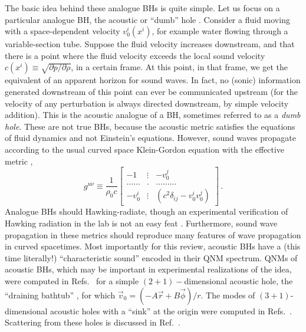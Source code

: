 \documentclass[]{iopart}
\def\be{\begin{equation}}
\def\ee{\end{equation}}
\begin{document}
The basic idea behind these analogue BHs is quite simple. Let us focus on a
particular analogue BH, the acoustic or ``dumb'' hole
\cite{Unruh:1980cg,Visser:1997ux}.  Consider a fluid moving with a
space-dependent velocity $v_0^i(x^i)$, for example water flowing through a
variable-section tube. Suppose the fluid velocity increases downstream, and
that there is a point where the fluid velocity exceeds the local sound
velocity $c(x^i)\equiv \sqrt{\partial p/\partial \rho}$, in a certain
frame. At this point, in that frame, we get the equivalent of an apparent
horizon for sound waves. In fact, no (sonic) information generated downstream
of this point can ever be communicated upstream (for the velocity of any
perturbation is always directed downstream, by simple velocity addition). This
is the acoustic analogue of a BH, sometimes referred to as a {\it dumb
  hole}. These are not true BHs, because the acoustic metric satisfies the
equations of fluid dynamics and not Einstein's equations.  However, sound
waves propagate according to the usual curved space Klein-Gordon equation with
the effective metric \cite{Unruh:1980cg,Visser:1997ux,Barcelo:2005fc},
%
\be
g^{u \nu}\equiv \frac{1}{\rho _0 c} \left[
\begin{array}{ccc}
-1 &\vdots&-v_0^{j}\\
\ldots \ldots &.&\ldots \ldots \ldots\\
-v_0^{i}&\vdots& (c^2 \delta _{ij}-v_0^iv_0^j)
\end{array}
\right]\,. \label{metricvisserinv} \ee
%
Analogue BHs should Hawking-radiate, though an experimental verification of
Hawking radiation in the lab is not an easy feat
\cite{novellovisser,Barcelo:2005fc}. Furthermore, sound wave propagation in
these metrics should reproduce many features of wave propagation in curved
spacetimes. Most importantly for this review, acoustic BHs have a (this time
literally!) ``characteristic sound'' \cite{Nollert:1999ji} encoded in their
QNM spectrum. QNMs of acoustic BHs, which may be important in experimental
realizations of the idea, were computed in
Refs.~\cite{Berti:2004ju,Cardoso:2004fi,Lepe:2004kv,Chen:2006zy} for a simple
$(2+1)-$dimensional acoustic hole, the ``draining bathtub''
\cite{Visser:1997ux}, for which ${\vec v}_0=(-A {\vec r}+B {\vec\phi})/r$. The
modes of $(3+1)$-dimensional acoustic holes with a ``sink'' at the origin were
computed in Refs.~\cite{Berti:2004ju,Xi:2007yb,Saavedra:2005ug}.  Scattering
from these holes is discussed in Ref.~\cite{Dolan:2009hd}. 
\end{document}
